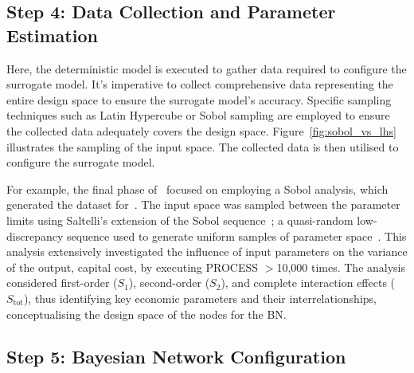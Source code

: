 \documentclass[journal]{IEEEtran}
\begin{document}
\subsection{\textbf{Step 4}: Data Collection and Parameter Estimation}\label{sec:data} 

Here, the deterministic model is executed to gather data required to configure the surrogate model. It's imperative to collect comprehensive data representing the entire design space to ensure the surrogate model's accuracy. Specific sampling techniques such as Latin Hypercube or Sobol sampling are employed to ensure the collected data adequately covers the design space. Figure~\ref{fig:sobol_vs_lhs} illustrates the sampling of the input space. The collected data is then utilised to configure the surrogate model. 

For example, the final phase of~\cite{Hidalgo-Salaverri2023} focused on employing a Sobol analysis, which generated the dataset for~\cite{Griffiths2024}. The input space was sampled between the parameter limits using Saltelli's extension of the Sobol sequence~\cite{Sobol2001, Saltelli2002}; a quasi-random low-discrepancy sequence used to generate uniform samples of parameter space~\cite{Herman2023}. This analysis extensively investigated the influence of input parameters on the variance of the output, capital cost, by executing PROCESS $>$10,000 times. The analysis considered first-order ($S_{1}$), second-order ($S_{2}$), and complete interaction effects ($S_{\text{tot}}$), thus identifying key economic parameters and their interrelationships, conceptualising the design space of the nodes for the BN.\@

\subsection{\textbf{Step 5}: Bayesian Network Configuration}\label{sec:BNconfiguration}
\end{document}
